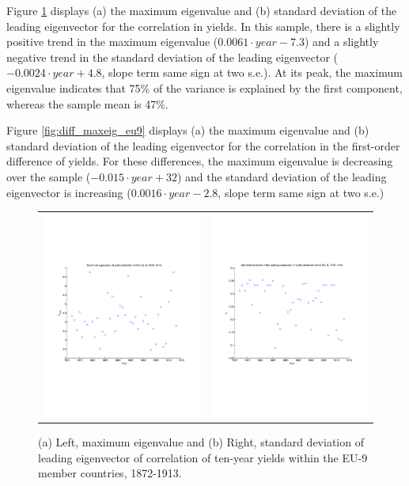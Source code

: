 \documentclass[3p]{elsarticle}
\begin{document}
Figure \ref{fig:maxeig_eu9} displays (a) the maximum eigenvalue and (b) standard deviation of the leading eigenvector for the correlation in yields.  In this sample, there is a slightly positive trend in the maximum eigenvalue ($0.0061 \cdot year - 7.3$) and a slightly negative trend in the standard deviation of the leading eigenvector ($-0.0024 \cdot year + 4.8$, slope term same sign at two s.e.).  At its peak, the maximum  eigenvalue indicates that 75\% of the variance is explained by the first component, whereas the sample mean is 47\%.

Figure \ref{fig:diff_maxeig_eu9} displays (a) the maximum eigenvalue and (b) standard deviation of the leading eigenvector for the correlation in the first-order difference of yields.  For these differences, the maximum eigenvalue is decreasing over the sample ($-0.015 \cdot year + 32$) and the standard deviation of the leading eigenvector is increasing ($0.0016 \cdot year - 2.8$, slope term same sign at two s.e.)

\begin{figure}[ht!]
	\centering
	\begin{tabular}{cc}
		\includegraphics[width=7cm]{fig_maxeig_eu9} & \includegraphics[width=7cm]{fig_maxeigstd_eu9}
	\end{tabular}
	\caption{(a) Left, maximum eigenvalue and (b) Right, standard deviation of leading eigenvector of correlation of ten-year yields within the EU-9 member countries, 1872-1913.}
	\label{fig:maxeig_eu9}
\end{figure}
\end{document}
